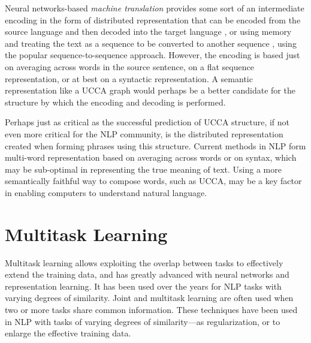 \documentclass[12pt,a4paper,table]{report}
\renewcommand\cite{\citep}      %
\begin{document}
Neural networks-based \textit{machine translation} provides some sort of
an intermediate encoding in the form of distributed representation that can be
encoded from the source language and then decoded into the target
language \cite{zou2013bilingual}, or using memory and treating the text as a
sequence to be converted to another sequence \cite{sutskever2014sequence},
using the popular sequence-to-sequence approach.
However, the encoding is based just on averaging across words in the source
sentence, on a flat sequence representation, or at best on a syntactic
representation. A semantic representation like a UCCA graph would perhaps be a
better candidate for the structure by which the encoding and decoding is
performed.

  \begin{center}
  \end{center}

Perhaps just as critical as the successful prediction of UCCA structure, if not
even more critical for the NLP community, is the distributed representation
created when forming phrases using this structure. Current methods in NLP form
multi-word representation based on averaging across words or on syntax, which
may be sub-optimal in representing the true meaning of text. Using a more
semantically faithful way to compose words, such as UCCA, may be a key factor
in enabling computers to understand natural language.


\section{Multitask Learning}\label{sec:multitask}

Multitask learning \citep{caruana1998multitask} allows exploiting the overlap between tasks
to effectively extend the training data, 
and has greatly advanced with neural networks and representation learning.
It has been used over the years for NLP tasks with varying degrees of similarity.
Joint and multitask learning are often used
when two or more tasks share common information.
These techniques have been used in NLP with tasks of varying degrees of similarity---as
regularization, or to enlarge the effective training data.
\end{document}
